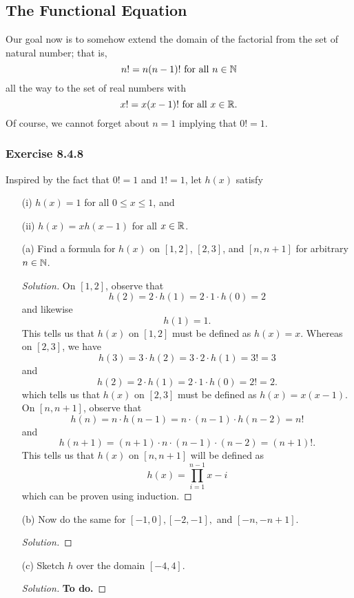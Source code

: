 \subsection{The Functional Equation}

Our goal now is to somehow extend the domain of the factorial from the set of natural number; that is, 
\[  n! = n (n-1)! \ \text{for all }  n \in \mathbb{N}   \] 
all the way to the set of real numbers with 
\[  x! = x(x-1)! \ \text {for all } x \in \mathbb{R}. \]
Of course, we cannot forget about \(  n = 1   \) implying that \( 0! = 1  \).

\subsubsection{Exercise 8.4.8} Inspired by the fact that \( 0! = 1  \) and \( 1! = 1  \), let \( h(x)  \) satisfy 
\begin{enumerate}
    \item[(i)] \( h(x) = 1  \) for all \( 0 \leq x \leq 1  \), and 
    \item[(ii)] \( h(x) = x h(x-1)  \) for all \( x \in \mathbb{R}  \).
\end{enumerate}
\begin{enumerate}
    \item[(a)] Find a formula for \( h(x)  \) on \( [1,2]  \), \( [2,3]  \), and \( [n, n +1 ] \) for arbitrary \( n \in \mathbb{N}  \).
        \begin{proof}[Solution] 
        On \( [1,2]  \), observe that 
        \[  h(2) = 2 \cdot h(1) = 2 \cdot 1 \cdot h(0) = 2 \]
        and likewise 
        \[  h(1) = 1. \] This tells us that \( h(x)  \) on \( [1,2]  \) must be defined as \( h(x) =x  \). Whereas on \( [2,3]  \), we have 
        \[  h(3) = 3 \cdot h(2) = 3 \cdot 2 \cdot h(1) = 3! = 3 \]
        and 
        \[  h(2) = 2 \cdot h(1) = 2 \cdot 1 \cdot h(0) = 2! = 2. \]
        which tells us that \( h(x)  \) on \( [2,3]  \) must be defined as \( h(x) = x (x-1)  \). On \( [n,n+1] \), observe that 
        \[  h(n) = n \cdot h(n-1) = n \cdot (n-1) \cdot h(n-2) = n!  \]
        and  
        \[  h(n+1) = (n+1) \cdot n \cdot (n-1) \cdot (n-2) = (n+1)!. \]
        This tells us that \( h(x)  \) on \( [n,n+1]  \) will be defined as 
        \[  h(x) = \prod_{i=1}^{n-1} x - i\] which can be proven using induction. 
        \end{proof}
    \item[(b)] Now do the same for \( [-1,0], [-2,-1] , \) and \( [-n, -n+1]  \).
        \begin{proof}[Solution] 
        
        \end{proof}
    \item[(c)] Sketch \( h  \) over the domain \( [-4,4]  \).
        \begin{proof}[Solution]
            \textbf{To do.}
        \end{proof}
\end{enumerate}
